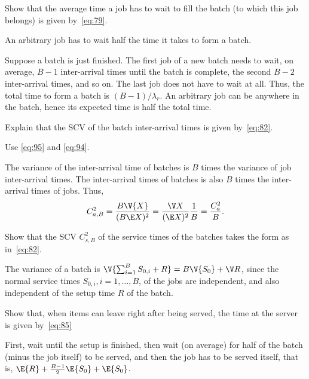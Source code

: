 \begin{exercise}\label{ex:48}
  Show that the average time a job has to wait to fill the batch (to which this job belongs) is given by~\cref{eq:79}.
\begin{hint}
An arbitrary job has to wait half the time it takes  to form a batch.
 \end{hint}
\begin{solution}
  Suppose a batch is just finished.
  The first job of a new batch needs to wait, on average, $B-1$ inter-arrival times until the batch is complete, the second $B-2$ inter-arrival times, and so on.
  The last job does not have to wait at all.
  Thus, the total time to form a batch is $(B-1)/\lambda_r$.
  An arbitrary job can be anywhere in the batch, hence its expected time is half the total time.
\end{solution}
\end{exercise}


\begin{exercise}\label{ex:490}
Explain that the SCV of the batch inter-arrival times is given by~\cref{eq:82}.
\begin{hint}
Use  \cref{eq:95} and \cref{eq:94}.
\end{hint}
\begin{solution}
The variance of the inter-arrival time of batches is $B$ times the variance of job inter-arrival times. The inter-arrival times of batches is also $B$ times the inter-arrival times of jobs. Thus,
\begin{equation*}
 C_{a,B}^2 = \frac{B \V{X}}{(B \E X)^2} = \frac{\V X}{(\E X)^2} \frac 1 B = \frac{C_a^2}{B}.
\end{equation*}
\end{solution}
\end{exercise}


\begin{exercise}\label{ex:491}
Show that the SCV $C_{s,B}^2$ of the service times of the batches takes the form as in~\cref{eq:82}.
\begin{solution}
 The variance of a batch is $\V{\sum_{i=1}^B S_{0,i} + R} = B\V{S_0} + \V R$, since the normal service times $S_{0,i}, i=1,\ldots,B$, of the jobs are independent, and also independent of the setup time $R$ of the batch.
\end{solution}
\end{exercise}

\begin{exercise}\label{ex:492}
Show that, when items can leave right after being served, the time at the server is given by~\cref{eq:85}
\begin{solution}
 First, wait until the setup is finished, then wait (on average) for half of the batch (minus the job itself) to be served, and then the job has to be served itself, that is,
$\E{R} + \frac{B-1}{2}\E{S_0} +\E{S_0}$.
\end{solution}
\end{exercise}





